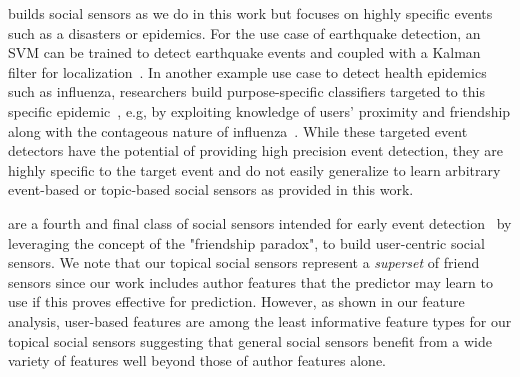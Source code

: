 \vspace{2mm}
 builds social sensors
as we do in this work but focuses on highly specific events 
such as a disasters or epidemics.  For the use case of earthquake
detection, an SVM can be trained to detect earthquake events
and coupled with a Kalman filter for localization~\cite{sakakiEq2}.
%
%
%
In another example use case to detect health epidemics such as
influenza, researchers build purpose-specific classifiers targeted to
this specific epidemic~\cite{culotta,aramaki}, e.g, by exploiting
knowledge of users' proximity and friendship along with the contageous
nature of influenza~\cite{sadilek}.  While these targeted event
detectors have the potential of providing high precision event
detection, they are highly specific to the target event and do not
easily generalize to learn arbitrary event-based or topic-based social
sensors as provided in this work.

\vspace{2mm}
are a fourth and final class of social sensors intended for early
event detection~\cite{sandy,garcia} by leveraging the concept of the
"friendship paradox"\cite{feld}, %
to build user-centric social sensors.  We note that our topical social
sensors represent a \emph{superset} of friend sensors since our work
includes author features that the predictor may learn to use if this
proves effective for prediction.  However, as shown in our feature
analysis, user-based features are among the least informative feature
types for our topical social sensors suggesting that general social
sensors benefit from a wide variety of features well beyond those of
author features alone.

